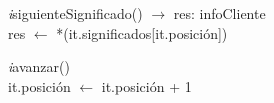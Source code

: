 \begin{Representacion}
\begin{Algoritmos}
\begin{algorithm}[H]
\textit{i}siguienteSignificado() $\longrightarrow$ res: infoCliente\\
\BlankLine
res $\leftarrow$ *(it.significados[it.posición])\\
\end{algorithm}

\begin{algorithm}[H]
\textit{i}avanzar()\\
\BlankLine
it.posición $\leftarrow$ it.posición + 1\\
\end{algorithm}

\end{Algoritmos}


\end{Representacion}
